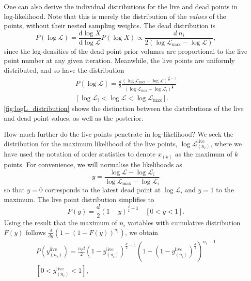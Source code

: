 \documentclass[usenatbib]{mnras}
\newcommand{\Like}{\mathcal{L}}
\newcommand{\logLmax}{\log \Like_\mathrm{max}}
\begin{document}
One can also derive the individual distributions for the live and dead points in log-likelihood. Note that this is merely the distribution of the \textit{values} of the points, without their nested sampling weights. The dead distribution is
\begin{equation}
    P(\log\Like) = \frac{\mathrm{d} \log X}{\mathrm{d} \log\Like} P(\log X) \propto \frac{d\:n_i}{2(\logLmax - \log\Like)},
\end{equation}
since the log-densities of the dead point prior volumes are proportional to the live point number at any given iteration. Meanwhile, the live points are uniformly distributed, and so have the distribution 
\begin{multline}
	P(\log\mathcal{L}) = \frac{d}{2}\frac{(\log\mathcal{L}_\mathrm{max}-\log\mathcal{L})^{\frac{d}{2}-1}}{(\log\mathcal{L}_\mathrm{max}-\log\mathcal{L}_i)^{\frac{d}{2}}} \\
    [\log\mathcal{L}_i < \log\mathcal{L} <\log\mathcal{L}_\mathrm{max}].
    \label{eq:PL}
\end{multline}
\cref{fig:logL_distribution} shows the distinction between the distributions of the live and dead point values, as well as the posterior. 
\par
How much further do the live points penetrate in log-likelihood? We seek the distribution for the maximum likelihood of the live points, $\log\Like_{(n_i)}^{\mathrm{live}}$, where we have used the notation of order statistics to denote $x_{(k)}$ as the maximum of $k$ points.  For convenience, we will normalise the likelihoods as
\begin{equation}
    y = \frac{\log\mathcal{L}-\log\mathcal{L}_i}{\log\mathcal{L}_\mathrm{max}-\log\mathcal{L}_i}
    \label{eq:normalised_likelihood}
\end{equation}
so that $y=0$ corresponds to the latest dead point at $\log\Like_i$ and $y=1$ to the maximum. The live point distribution simplifies to
\begin{equation}
    P(y) = \frac{d}{2}(1-y)^{\frac{d}{2}-1} \quad [0<y<1].
    \label{eq:Py}
\end{equation}
Using the result that the maximum of $n_i$ variables with cumulative distribution $F(y)$ follows $\frac{d}{dy}( 1- (1-F(y))^{n_i})$, we obtain
\begin{multline}
    P(y_{(n_i)}^\mathrm{live}) = \frac{n_i d}{2}(1-y_{(n_i)}^\mathrm{live})^{\frac{d}{2}-1}\left(1-(1-y_{(n_i)}^\mathrm{live})^{\frac{d}{2}}\right)^{n_i-1}\\ 
    [0<y_{(n_i)}^\mathrm{live}<1],
    \label{eq:Pyhat}
\end{multline}
\end{document}

